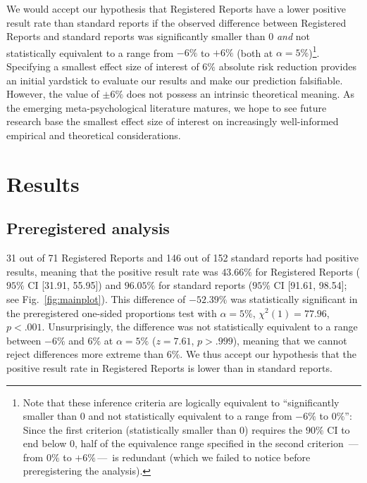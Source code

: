 \documentclass[british,,jou,floatsintext]{apa6}
\begin{document}
We would accept our hypothesis that Registered Reports have a lower positive result rate than standard reports if the observed difference between Registered Reports and standard reports was significantly smaller than 0 \emph{and} not statistically equivalent to a range from \(-6\%\) to \(+6\%\) (both at \(\alpha = 5\%\))\footnote{Note that these inference criteria are logically equivalent to \enquote{significantly smaller than 0 and not statistically equivalent to a range from \(-6\%\) to \(0\%\)}: Since the first criterion (statistically smaller than 0) requires the \(90\%\) CI to end below 0, half of the equivalence range specified in the second criterion \(\,\)---\(\,\)from \(0\%\) to \(+6\%\,\)---\(\,\) is redundant (which we failed to notice before preregistering the analysis).}.
Specifying a smallest effect size of interest of \(6\%\) absolute risk reduction provides an initial yardstick to evaluate our results and make our prediction falsifiable.
However, the value of \(\pm 6\%\) does not possess an intrinsic theoretical meaning.
As the emerging meta-psychological literature matures, we hope to see future research base the smallest effect size of interest on increasingly well-informed empirical and theoretical considerations.

\hypertarget{results}{%
\section{Results}\label{results}}

\hypertarget{preregistered-analysis}{%
\subsection{Preregistered analysis}\label{preregistered-analysis}}

31 out of 71 Registered Reports and 146 out of 152 standard reports had positive results, meaning that the positive result rate was \(43.66 \%\) for Registered Reports (\(95 \%\) CI {[}31.91, 55.95{]}) and \(96.05 \%\) for standard reports (\(95 \%\) CI {[}91.61, 98.54{]}; see Fig.~\ref{fig:mainplot}).
This difference of \(-52.39 \%\) was statistically significant in the preregistered one-sided proportions test with \(\alpha = 5\%\), \(\chi^2(1) = 77.96\), \(p < .001\).
Unsurprisingly, the difference was not statistically equivalent to a range between \(-6 \%\) and \(6 \%\) at \(\alpha = 5\%\) (\(z = 7.61\), \(p > .999\)), meaning that we cannot reject differences more extreme than \(6\%\).
We thus accept our hypothesis that the positive result rate in Registered Reports is lower than in standard reports.
\end{document}
